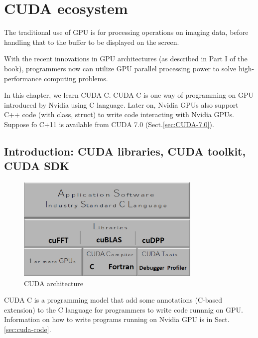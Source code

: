   

\chapter{CUDA ecosystem}
\label{chap:c-cuda}

The traditional use of GPU is for processing operations on imaging data, before
handling that to the buffer to be displayed on the screen.

With the recent innovations in GPU architectures (as described in Part I of the
book), programmers now can utilize GPU parallel processing power to solve
high-performance computing problems. 

In this chapter, we learn CUDA C. CUDA C is one way of programming on GPU
introduced by Nvidia using C language. Later on, Nvidia GPUs also support C++
code (with class, struct) to write code interacting with Nvidia GPUs. Suppose fo
C+11 is available from CUDA 7.0 (Sect.\ref{sec:CUDA-7.0}).


\section{Introduction: CUDA libraries, CUDA toolkit, CUDA SDK}
\label{sec:introduction-6}

\begin{figure}[hbt]
  \centerline{\includegraphics[height=5cm,
    angle=0]{./images/cuda_architecture.eps}}
\caption{CUDA architecture}
\label{fig:cuda_arch}
\end{figure}

CUDA C is a programming model that add some annotations (C-based extension) to
the C language for programmers to write code runnnig on GPU. Information on how to write 
programs running on Nvidia GPU is in Sect.\ref{sec:cuda-code}.

